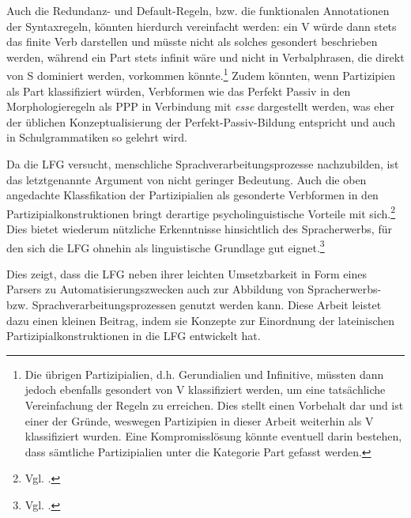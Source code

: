 \documentclass[12pt,a4paper]{article}
\begin{document}
Auch die Redundanz- und Default-Regeln, bzw. die funktionalen Annotationen der Syntaxregeln, könnten hierdurch vereinfacht werden: ein V würde dann stets das finite Verb darstellen und müsste nicht als solches gesondert beschrieben werden, während ein Part stets infinit wäre und nicht in Verbalphrasen, die direkt von S dominiert werden, vorkommen könnte.\footnote{Die übrigen Partizipialien, d.h. Gerundialien und Infinitive, müssten dann jedoch ebenfalls gesondert von V klassifiziert werden, um eine tatsächliche Vereinfachung der Regeln zu erreichen. Dies stellt einen Vorbehalt dar und ist einer der Gründe, weswegen Partizipien in dieser Arbeit weiterhin als V klassifiziert wurden. Eine Kompromisslösung könnte eventuell darin bestehen, dass sämtliche Partizipialien unter die Kategorie Part gefasst werden.} Zudem könnten, wenn Partizipien als Part klassifiziert würden, Verbformen wie das Perfekt Passiv in den Morphologieregeln als PPP in Verbindung mit \textit{esse} dargestellt werden, was eher der üblichen Konzeptualisierung der Perfekt-Passiv-Bildung entspricht und auch in Schulgrammatiken so gelehrt wird. 

Da die LFG versucht, menschliche Sprachverarbeitungsprozesse nachzubilden, ist das letztgenannte Argument von nicht geringer Bedeutung. Auch die oben angedachte Klassfikation der Partizipialien als gesonderte Verbformen in den Partizipialkonstruktionen bringt derartige psycholinguistische Vorteile mit sich.\footnote{Vgl. \cite[12; 60]{Rohrer}.} Dies bietet wiederum nützliche Erkenntnisse hinsichtlich des Spracherwerbs, für den sich die LFG ohnehin als linguistische Grundlage gut eignet.\footnote{Vgl. \cite[21]{DAZ}.} 

Dies zeigt, dass die LFG neben ihrer leichten Umsetzbarkeit in Form eines Parsers zu Automatisierungszwecken auch zur Abbildung von Spracherwerbs- bzw. Sprachverarbeitungsprozessen genutzt werden kann. Diese Arbeit leistet dazu einen kleinen Beitrag, indem sie Konzepte zur Einordnung der lateinischen Partizipialkonstruktionen in die LFG entwickelt hat.

%
\pagebreak
\printbibliography
\end{document}
